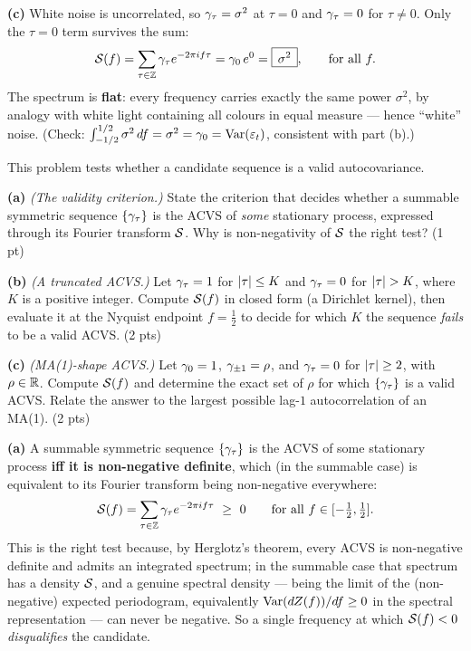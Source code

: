 \documentclass[11pt]{article}
\begin{document}
\textbf{(c)} White noise is uncorrelated, so $\gamma_\tau=\sigma^2$ at $\tau=0$ and $\gamma_\tau=0$ for $\tau\ne0$. Only the $\tau=0$ term survives the sum:
\[
\mathcal{S}(f)=\sum_{\tau\in\mathbb{Z}}\gamma_\tau e^{-2\pi i f\tau}=\gamma_0\,e^{0}=\boxed{\,\sigma^2\,},\qquad\text{for all }f .
\]
The spectrum is \textbf{flat}: every frequency carries exactly the same power $\sigma^2$, by analogy with white light containing all colours in equal measure --- hence ``white'' noise. (Check: $\int_{-1/2}^{1/2}\sigma^2\,df=\sigma^2=\gamma_0=\operatorname{Var}(\varepsilon_t)$, consistent with part (b).)

\statementstart
This problem tests whether a candidate sequence is a valid autocovariance.

\textbf{(a)} \emph{(The validity criterion.)} State the criterion that decides whether a summable symmetric sequence $\{\gamma_\tau\}$ is the ACVS of \emph{some} stationary process, expressed through its Fourier transform $\mathcal{S}$. Why is non-negativity of $\mathcal{S}$ the right test? \hfill(1 pt)

\textbf{(b)} \emph{(A truncated ACVS.)} Let $\gamma_\tau=1$ for $\left\lvert \tau \right\rvert\le K$ and $\gamma_\tau=0$ for $\left\lvert \tau \right\rvert>K$, where $K$ is a positive integer. Compute $\mathcal{S}(f)$ in closed form (a Dirichlet kernel), then evaluate it at the Nyquist endpoint $f=\tfrac12$ to decide for which $K$ the sequence \emph{fails} to be a valid ACVS. \hfill(2 pts)

\textbf{(c)} \emph{(MA(1)-shape ACVS.)} Let $\gamma_0=1$, $\gamma_{\pm1}=\rho$, and $\gamma_\tau=0$ for $\left\lvert \tau \right\rvert\ge2$, with $\rho\in\mathbb{R}$. Compute $\mathcal{S}(f)$ and determine the exact set of $\rho$ for which $\{\gamma_\tau\}$ is a valid ACVS. Relate the answer to the largest possible lag-$1$ autocorrelation of an MA(1). \hfill(2 pts)
\statementend

\textbf{(a)} A summable symmetric sequence $\{\gamma_\tau\}$ is the ACVS of some stationary process \textbf{iff it is non-negative definite}, which (in the summable case) is equivalent to its Fourier transform being non-negative everywhere:
\[
\mathcal{S}(f)=\sum_{\tau\in\mathbb{Z}}\gamma_\tau e^{-2\pi i f\tau}\ \ge\ 0\qquad\text{for all }f\in[-\tfrac12,\tfrac12].
\]
This is the right test because, by Herglotz's theorem, every ACVS is non-negative definite and admits an integrated spectrum; in the summable case that spectrum has a density $\mathcal{S}$, and a genuine spectral density --- being the limit of the (non-negative) expected periodogram, equivalently $\operatorname{Var}(dZ(f))/df\ge0$ in the spectral representation --- can never be negative. So a single frequency at which $\mathcal{S}(f)<0$ \emph{disqualifies} the candidate.
\end{document}
